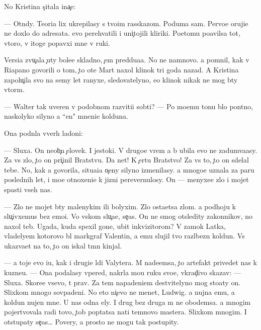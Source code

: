 \documentclass[10pt]{book}
\begin{document}
No Kristina s{\c}itala ina{\c}e:

— Otn{\iu}dy. Teori{\y}a lix ukrepilasy s tvo{\y}im rasskazom. Poduma{\y} sam. Pervo{\y}e oruji{\y}e ne doxlo do adresata. {\Y}evo perehvatili i uni{\c}tojili kliriki. Poetomu po{\y}avilsa tot, vtoro{\y}, v itoge popavxi{\y} mne v ruki.

Versi{\y}a zvu{\c}ala {\c}uty bole{\y}e skladno, {\c}em pred{\yi}du{\x}a{\y}a. No ne namnovo. {\Y}a pomnil, kak v Riapano govorili o tom, {\c}to ote{\q} Mart naxol klinok tri goda nazad. A Kristina zapolu{\c}ila svo{\y} na semy let ranyxe, sledovatelyno, {\y}e{\y}o klinok nikak ne mog b{\yi}ty vtor{\yi}m.

— Walter tak uveren v podobnom razviti{\y}i sob{\yi}ti{\y}? — Po mo{\y}emu tonu b{\yi}lo pon{\ia}tno, naskolyko silyno {\y}a ``{\q}en{\iu}" mneni{\y}e kolduna.

Ona podn{\ia}la vverh ladoni:

— Sluxa{\y}. On neob{\yi}{\c}n{\yi}{\y} {\c}elovek. I jestoki{\y}. V drugo{\y}e vrem{\ia} {\y}a b{\yi} ubila {\y}evo ne zadum{\yi}va{\y}asy. Za vs{\e} zlo, {\c}to on pri{\c}inil Bratstvu. Da net! K {\c}ertu Bratstvo! Za vs{\e} to, {\c}to on sdelal tebe. No, kak {\y}a govorila, situa{\q}i{\y}a o{\c}eny silyno izmenilasy. {\Y}a mnogo{\y}e uznala za paru poslednih let, i mo{\y}e otnoxeni{\y}e k jizni perevernulosy. On — menyxe{\y}e zlo i mojet spasti vseh nas.

— Zlo ne mojet b{\yi}ty malenykim ili bolyxim. Zlo osta{\y}etsa zlom. {\Y}a podhoju k slu{\c}ivxemus{\ia} bez emo{\q}i{\y}. Vo vs{\ia}kom slu{\c}a{\y}e, se{\y}{\c}as. On ne smog otsledity zakonnikov, no naxol teb{\ia}. Ugada{\y}, kuda spexil gone{\q}, ubit{\yi}{\y} inkvizitorom? V zamok Latka, vladely{\q}em kotorovo b{\yi}l markgraf Valentin, a {\y}emu slujil tvo{\y} razl{\iu}bezn{\yi}{\y} koldun. Vs{\e} ukaz{\yi}va{\y}et na to, {\c}to on iskal t{\e}mn{\yi}{\y} kinjal.

— {\Y}a toje {\y}evo i{\x}u, kak i drugi{\y}e l{\iu}di Valytera. M{\yi} nade{\y}emsa, {\c}to artefakt privedet nas k kuzne{\q}u. — Ona podalasy vpered, nakr{\yi}la mo{\y}u ruku svo{\y}e{\y}, vkrad{\c}ivo skazav: — Sluxa{\y}. Skore{\y}e vsevo, t{\yi} prav. Za tem napadeni{\y}em de{\y}stvitelyno mog sto{\y}aty on. Slixkom mnogo sovpadeni{\y}. No eto ni{\c}evo ne men{\ia}{\y}et, Ludwig. {\Y}a nujna {\y}emu, a koldun nujen mne. U nas odna {\q}ely. I drug bez druga m{\yi} ne obo{\y}demsa. {\Y}a mnogim pojertvovala radi tovo, {\c}tob{\yi} pop{\yi}tatsa na{\y}ti temnovo mastera. Slixkom mnogim. I otstupaty se{\y}{\c}as… Povery, {\y}a prosto ne mogu tak postupity.
\end{document}
